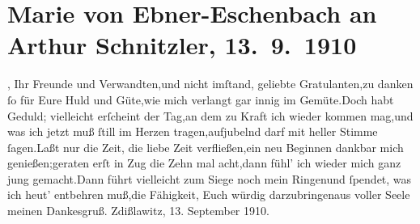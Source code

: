 

         
         \renewcommand{\erwaehntePersonen}{Personen: Marie von Ebner-Eschenbach}
         \renewcommand{\erwaehnteOrte}{Orte: Wien, Zdislavice}
         \renewcommand{\erwaehnteWerke}{}
               \section[Marie von Ebner-Eschenbach an Arthur Schnitzler, 13. 9. 1910]{ Marie von Ebner-Eschenbach an Arthur Schnitzler, 13. 9. 1910}\nopagebreak{}\rehead{ }\begin{ledgroupsized}[t]{13cm}\normalsize\beginnumbering{} \toendnotes[C]{\smallbreak\pagebreak[2]} 
\toendnotes[C]{\smallbreak}\stanza{}{\pb}\label{K_L02580-1v}\label{K_L02580-1h}, Ihr Freunde und
                  Verwandten,\newverse{}und nicht imſtand, geliebte Gratulanten,\newverse{}zu danken ſo für Eure Huld und Güte,\newverse{}wie mich verlangt gar innig im Gemüte.\newverse{}Doch habt Geduld; vielleicht erſcheint der Tag,\newverse{}an dem zu Kraft ich wieder kommen mag,\newverse{}und was ich jetzt muß ſtill im Herzen tragen,\newverse{}aufjubelnd darf mit heller Stimme ſagen.\newverse{}Laßt nur die Zeit, die liebe Zeit verfließen,\newverse{}ein neu Beginnen dankbar mich genießen;\newverse{}geraten erſt in Zug die Zehn mal acht,\newverse{}dann fühl’ ich wieder mich ganz jung gemacht.\newverse{}Dann führt vielleicht zum Siege noch mein Ringen\newverse{}und ſpendet, was ich heut’ entbehren muß,\newverse{}die Fähigkeit, Euch würdig darzubringen\newverse{}aus voller Seele meinen Dankesgruß.\stanzaend{}\pstart \spacefill\mbox{}\pend{}\pstart
           Zdißlawitz, 13. September
                  1910.\pend
           
         
         \endnumbering{}\end{ledgroupsized}  \newcommand{\dateiname}{L02580}\newcommand{\titel}{Marie von Ebner-Eschenbach an Arthur Schnitzler, 13. 9. 1910}\newcommand{\editorInnen}{Martin Anton Müller und Laura Untner}
      